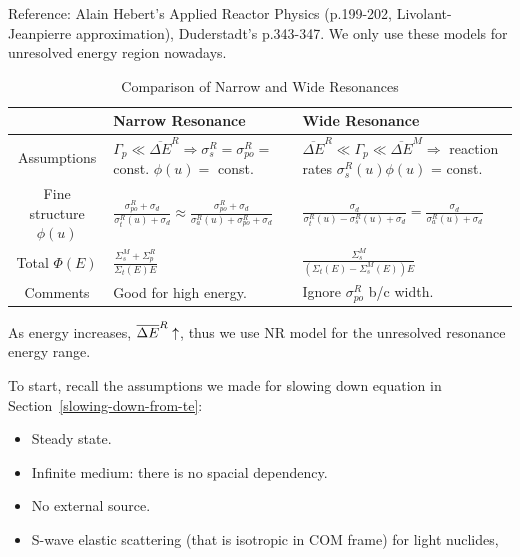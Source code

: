 \documentclass{school-22.211-notes}
\date{February 29, 2012}
\begin{document}
\maketitle



Reference: Alain Hebert's Applied Reactor Physics (p.199-202, Livolant-Jeanpierre approximation), Duderstadt's p.343-347. We only use these models for unresolved energy region nowadays. 

\begin{table}[ht]
  \centering
  \begin{tabular}{|c|p{2in}|p{2.5in}|} \hline
     & Narrow Resonance & Wide Resonance  \\ \hline
    Assumptions & $\Gamma_p \ll \overline{\Delta E}^R \Rightarrow \sigma_s^R = \sigma_{po}^R = $const. $\phi(u)=$ const.  & $ \overline{\Delta E}^R \ll \Gamma_p \ll \overline{\Delta E}^M \Rightarrow$ reaction rates $\sigma_s^R(u) \phi(u)$ = const. \\ \hline
    Fine structure $\phi(u)$ & $\displaystyle \frac{\sigma_{po}^R + \sigma_d}{\sigma_{t}^R (u) + \sigma_d} \approx \frac{\sigma_{po}^R + \sigma_d}{\sigma_{a}^R(u) + \sigma_{po}^R + \sigma_d }$ &  $\displaystyle \frac{\sigma_d}{\sigma_{t}^R (u) - \sigma_{s}^R (u) + \sigma_d} = \frac{\sigma_d}{\sigma_{a}^R (u) +  \sigma_d }$   \\ \hline
    Total $\Phi (E)$ &  $\displaystyle\frac{\Sigma_s^M + \Sigma_p^R}{\Sigma_t(E) E}$  & $\displaystyle\frac{\Sigma_s^M}{(\Sigma_t(E) - \Sigma_s^M(E))E}$ \\ \hline 
    Comments & Good for high energy.   & Ignore $\sigma_{po}^R$ b/c width.  \\ \hline
  \end{tabular}
  \caption{Comparison of Narrow and Wide Resonances}
\end{table}
As energy increases, $\overline{\Delta E}^R \uparrow$, thus we use NR model for the unresolved resonance energy range. 

To start, recall the assumptions we made for slowing down equation in Section~\ref{slowing-down-from-te}: 
\begin{itemize}
\item Steady state.
\item Infinite medium: there is no spacial dependency. 
\item No external source. 
\item S-wave elastic scattering (that is isotropic in COM frame) for light nuclides, 
\end{itemize}
\end{document}
